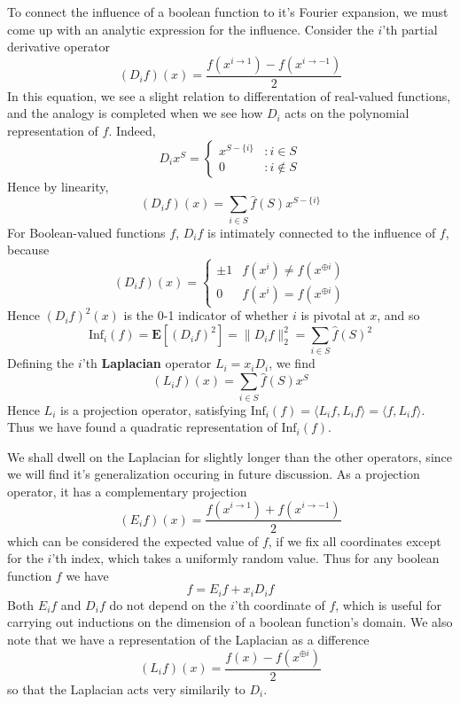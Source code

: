 To connect the influence of a boolean function to it's Fourier expansion, we must come up with an analytic expression for the influence. Consider the $i$'th partial derivative operator
%
\[ (D_if)(x) = \frac{f(x^{i \to 1}) - f(x^{i \to -1})}{2} \]
%
In this equation, we see a slight relation to differentation of real-valued functions, and the analogy is completed when we see how $D_i$ acts on the polynomial representation of $f$. Indeed,
%
\[ D_ix^S = \begin{cases} x^{S - \{ i \}} & : i \in S \\ 0 & : i \not \in S \end{cases} \]
%
Hence by linearity,
%
\[ (D_if)(x) = \sum_{i \in S} \widehat{f}(S) x^{S - \{ i \}} \]
%
For Boolean-valued functions $f$, $D_if$ is intimately connected to the influence of $f$, because
%
\[ (D_if)(x) = \begin{cases} \pm 1 & f(x^i) \neq f(x^{\oplus i}) \\ 0 & f(x^i) = f(x^{\oplus i}) \end{cases} \]
%
Hence $(D_if)^2(x)$ is the 0-1 indicator of whether $i$ is pivotal at $x$, and so
%
\[ \text{Inf}_i(f) = \mathbf{E}[(D_if)^2] = \| D_if \|_2^2 = \sum_{i \in S} \widehat{f}(S)^2 \]
%
Defining the $i$'th {\bf Laplacian} operator $L_i = x_i D_i$, we find
%
\[ (L_i f)(x) = \sum_{i \in S} \widehat{f}(S) x^S \]
%
Hence $L_i$ is a projection operator, satisfying $\text{Inf}_i(f) = \langle L_i f, L_i f \rangle = \langle f, L_i f \rangle$. Thus we have found a quadratic representation of $\text{Inf}_i(f)$.

We shall dwell on the Laplacian for slightly longer than the other operators, since we will find it's generalization occuring in future discussion. As a projection operator, it has a complementary projection
%
\[ (E_i f)(x) = \frac{f(x^{i \to 1}) + f(x^{i \to -1})}{2} \]
%
which can be considered the expected value of $f$, if we fix all coordinates except for the $i$'th index, which takes a uniformly random value. Thus for any boolean function $f$ we have
%
\[ f = E_i f + x_i D_i f \]
%
Both $E_i f$ and $D_i f$ do not depend on the $i$'th coordinate of $f$, which is useful for carrying out inductions on the dimension of a boolean function's domain. We also note that we have a representation of the Laplacian as a difference
%
\[ (L_i f)(x) = \frac{f(x) - f(x^{\oplus i})}{2} \]
%
so that the Laplacian acts very similarily to $D_i$.

